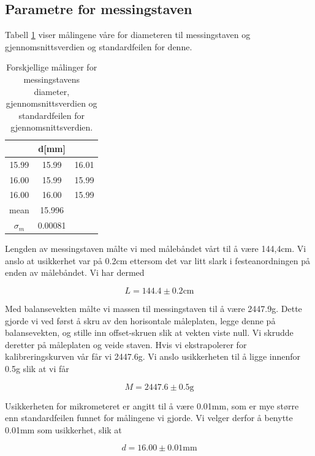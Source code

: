 \documentclass[a4paper,11pt, twocolumn]{article}
\begin{document}
\subsection{Parametre for messingstaven}
Tabell \ref{tab:diameter} viser målingene våre for diameteren til messingstaven og gjennomsnittsverdien og standardfeilen for denne.

\begin{table}[!ht]
\centering
\caption{Forskjellige målinger for messingstavens diameter, gjennomsnittsverdien og standardfeilen for gjennomsnittsverdien.}
\label{tab:diameter}
\begin{tabular}{ccc}
	\toprule
	\toprule
	 & d[mm]&\\
	\hline
	15.99 & 15.99 & 16.01\\
	16.00 & 15.99 & 15.99\\
	16.00 & 16.00 & 15.99\\
	\hline
	mean & 15.996 &\\
	$\sigma_m$ & 0.00081&\\
	\toprule
\end{tabular}
\end{table}

Lengden av messingstaven målte vi med målebåndet vårt til å være 144,4cm. Vi anslo at usikkerhet var på 0.2cm ettersom det var litt slark i festeanordningen på enden av målebåndet. Vi har dermed 

\begin{equation}
L=144.4\pm0.2\text{cm} 
\end{equation}

Med balansevekten målte vi massen til messingstaven til å være 2447.9g.  Dette gjorde vi ved først å skru av den horisontale måleplaten, legge denne på balansevekten, og stille inn offset-skruen slik at vekten viste null. Vi skrudde deretter på måleplaten og veide staven. Hvis vi ekstrapolerer for kalibreringskurven vår får vi 2447.6g. Vi anslo usikkerheten til å ligge innenfor 0.5g slik at vi får

\begin{equation}
	M = 2447.6\pm0.5\text{g}
\end{equation} 

Usikkerheten for mikrometeret er angitt til å være 0.01mm, som er mye større enn standardfeilen funnet for målingene vi gjorde. Vi velger derfor å benytte 0.01mm som usikkerhet, slik at

\begin{equation}
	d = 16.00\pm0.01\text{mm}
\end{equation}
\end{document}
